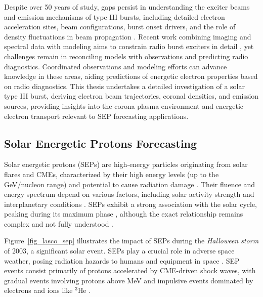 Despite over 50 years of study, gaps persist in understanding the exciter beams and emission mechanisms of type III bursts, including detailed electron acceleration sites, beam configurations, burst onset drivers, and the role of density fluctuations in beam propagation \citep{reid_2018a, reid_2018b, li_2012a}. Recent work combining imaging and spectral data with modeling aims to constrain radio burst exciters in detail \citep{chen_2013b, kontar_2017}, yet challenges remain in reconciling models with observations and predicting radio diagnostics. Coordinated observations and modeling efforts can advance knowledge in these areas, aiding predictions of energetic electron properties based on radio diagnostics. This thesis undertakes a detailed investigation of a solar type III burst, deriving electron beam trajectories, coronal densities, and emission sources, providing insights into the corona plasma environment and energetic electron transport relevant to SEP forecasting applications.


\subsection{Solar Energetic Protons Forecasting}
Solar energetic protons (SEPs) are high-energy particles originating from solar flares and CMEs, characterized by their high energy levels (up to the GeV/nucleon range) and potential to cause radiation damage \citep{aschwanden_2002, lin_2005, reames_2013}. Their fluence and energy spectrum depend on various factors, including solar activity strength and interplanetary conditions \citep{kahler_1984, kahler_1987, debrunner_1988, miteva_2013, trottet_2015, dierckxsens_2015, le_2017, gopalswamy_2017}. SEPs exhibit a strong association with the solar cycle, peaking during its maximum phase \citep{reames_2013}, although the exact relationship remains complex and not fully understood \citep{nymmik_2007, ramstad_2018}.

Figure~\ref{fig_lasco_sep} illustrates the impact of SEPs during the \textit{Halloween storm} of 2003, a significant solar event. SEPs play a crucial role in adverse space weather, posing radiation hazards to humans and equipment in space \citep{reames_1999}. SEP events consist primarily of protons accelerated by CME-driven shock waves, with gradual events involving protons above  MeV and impulsive events dominated by electrons and ions like $^3$He \citep{reames_2013, nitta_2015}.


